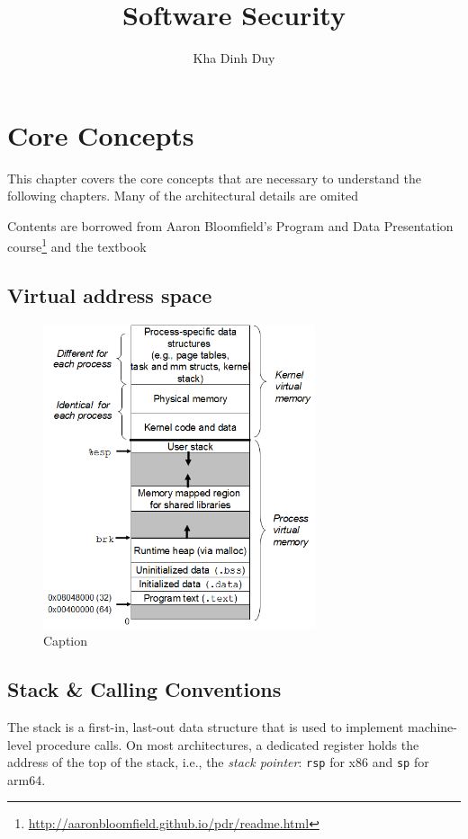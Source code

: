 \documentclass[11pt]{memoir}
\title{Software Security}
\author{Kha Dinh Duy}
\begin{document}
\maketitle
\tableofcontents

\makepagenote

\chapter{Core Concepts}
This chapter covers the core concepts that are necessary to understand the following chapters.
Many of the architectural details are omited 

Contents are borrowed from Aaron Bloomfield's Program and Data Presentation course\footnote{\url{http://aaronbloomfield.github.io/pdr/readme.html}} and the textbook \cite{bryant2016computer}

\section{Virtual address space}

\begin{figure}
    \centering
    \includegraphics[width=8cm]{figures/malloc1.png}
    \caption{Caption}
    \label{fig:addr_space}
\end{figure}


\section{Stack \& Calling Conventions}
The stack is a first-in, last-out data structure that is used to implement machine-level procedure calls. 
On most architectures, a dedicated register holds the address of the top of the stack, i.e., the \emph{stack pointer}: \texttt{rsp} for x86 and \texttt{sp} for arm64.
\end{document}
